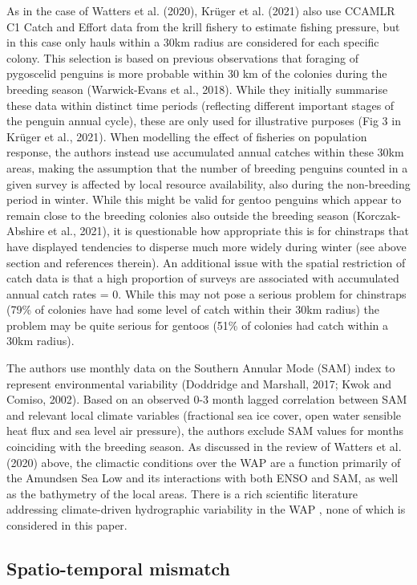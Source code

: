 \documentclass[]{elsarticle} %
\begin{document}
As in the case of Watters et al. (2020), Krüger et al. (2021) also use
CCAMLR C1 Catch and Effort data from the krill fishery to estimate
fishing pressure, but in this case only hauls within a 30km radius are
considered for each specific colony. This selection is based on previous
observations that foraging of pygoscelid penguins is more probable
within 30 km of the colonies during the breeding season (Warwick-Evans
et al., 2018). While they initially summarise these data within distinct
time periods (reflecting different important stages of the penguin
annual cycle), these are only used for illustrative purposes (Fig 3 in
Krüger et al., 2021). When modelling the effect of fisheries on
population response, the authors instead use accumulated annual catches
within these 30km areas, making the assumption that the number of
breeding penguins counted in a given survey is affected by local
resource availability, also during the non-breeding period in winter.
While this might be valid for gentoo penguins which appear to remain
close to the breeding colonies also outside the breeding season
(Korczak-Abshire et al., 2021), it is questionable how appropriate this
is for chinstraps that have displayed tendencies to disperse much more
widely during winter (see above section and references therein). An
additional issue with the spatial restriction of catch data is that a
high proportion of surveys are associated with accumulated annual catch
rates = 0. While this may not pose a serious problem for chinstraps
(79\% of colonies have had some level of catch within their 30km radius)
the problem may be quite serious for gentoos (51\% of colonies had catch
within a 30km radius).

The authors use monthly data on the Southern Annular Mode (SAM) index to
represent environmental variability (Doddridge and Marshall, 2017; Kwok
and Comiso, 2002). Based on an observed 0-3 month lagged correlation
between SAM and relevant local climate variables (fractional sea ice
cover, open water sensible heat flux and sea level air pressure), the
authors exclude SAM values for months coinciding with the breeding
season. As discussed in the review of Watters et al. (2020) above, the
climactic conditions over the WAP are a function primarily of the
Amundsen Sea Low and its interactions with both ENSO and SAM, as well as
the bathymetry of the local areas. There is a rich scientific literature
addressing climate-driven hydrographic variability in the WAP , none of
which is considered in this paper.

\hypertarget{spatio-temporal-mismatch}{%
\subsection{Spatio-temporal mismatch}\label{spatio-temporal-mismatch}}
\end{document}
